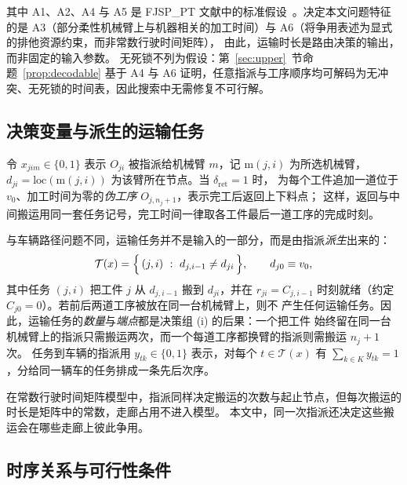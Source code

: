 \documentclass[manuscript,screen,review]{acmart}
\begin{document}
其中 A1、A2、A4 与 A5 是 FJSP\_PT 文献中的标准假设~\cite{xin2025review}。决定本文问题特征的是 A3（部分柔性机械臂上与机器相关的加工时间）与 A6（将争用表述为显式的排他资源约束，而非常数行驶时间矩阵），
由此，运输时长是路由决策的输出，而非固定的输入参数。
无死锁不列为假设：第~\ref{sec:upper}~节命题~\ref{prop:decodable} 基于 A4 与 A6 证明，任意指派与工序顺序均可解码为无冲突、无死锁的时间表，因此搜索中无需修复不可行解。

\subsection{决策变量与派生的运输任务}

令 $x_{jim}\in\{0,1\}$ 表示 $O_{ji}$ 被指派给机械臂 $m$，记 $\mathrm{m}(j,i)$ 为所选机械臂，
$d_{ji}=\mathrm{loc}(\mathrm{m}(j,i))$ 为该臂所在节点。当 $\delta_{\mathrm{ret}}=1$ 时，
为每个工件追加一道位于 $v_0$、加工时间为零的\emph{伪工序} $O_{j,n_j+1}$，表示完工后返回上下料点；
这样，返回与中间搬运用同一套任务记号，完工时间一律取各工件最后一道工序的完成时刻。

与车辆路径问题不同，运输任务并不是输入的一部分，而是由指派\emph{派生}出来的：
\begin{equation}
\label{eq:tasks}
\mathcal{T}(x)=\Bigl\{\,(j,i)\ :\ d_{j,i-1}\neq d_{ji}\,\Bigr\},
\qquad d_{j0}\equiv v_0 ,
\end{equation}
其中任务 $(j,i)$ 把工件 $j$ 从 $d_{j,i-1}$ 搬到 $d_{ji}$，并在
$r_{ji}=C_{j,i-1}$ 时刻就绪（约定 $C_{j0}=0$）。若前后两道工序被放在同一台机械臂上，则不
产生任何运输任务。因此，运输任务的\emph{数量}与\emph{端点}都是决策组 (i) 的后果：一个把工件
始终留在同一台机械臂上的指派只需搬运两次，而一个每道工序都换臂的指派则需搬运 $n_j+1$ 次。
任务到车辆的指派用 $y_{tk}\in\{0,1\}$ 表示，对每个 $t\in\mathcal{T}(x)$ 有
$\sum_{k\in K}y_{tk}=1$，分给同一辆车的任务排成一条先后次序。

在常数行驶时间矩阵模型中，指派同样决定搬运的次数与起止节点，但每次搬运的时长是矩阵中的常数，走廊占用不进入模型。
本文中，同一次指派还决定这些搬运会在哪些走廊上彼此争用。

\subsection{时序关系与可行性条件}
\end{document}

